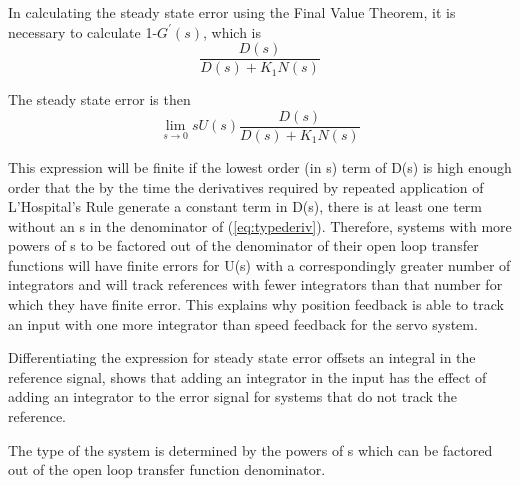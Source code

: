 \documentclass[11pt,a4paper]{article}
\begin{document}
\begin{enumerate}
In calculating the steady state error using the Final Value Theorem, it is necessary to calculate 1-$G^{\prime}(s)$, which is
\begin{equation}\label{eq:typederiv}
	\frac{D(s)}{D(s) + K_{1}N(s)}
\end{equation}

The steady state error is then
\begin{equation}
	\lim_{s \to 0}sU(s)\frac{D(s)}{D(s) + K_{1}N(s)}
\end{equation}

This expression will be finite if the lowest order (in s) term of D(s) is high enough order that the by the time the derivatives required by repeated application of L'Hospital's Rule generate a constant term in D(s), there is at least one term without an s in the denominator of (\ref{eq:typederiv}). Therefore, systems with more powers of s to be factored out of the denominator of their open loop transfer functions will have finite errors for U(s) with a correspondingly greater number of integrators and will track references with fewer integrators than that number for which they have finite error. This explains why position feedback is able to track an input with one more integrator than speed feedback for the servo system. 

Differentiating the expression for steady state error offsets an integral in the reference signal, shows that adding an integrator in the input has the effect of adding an integrator to the error signal for systems that do not track the reference. 

The type of the system is determined by the powers of s which can be factored out of the open loop transfer function denominator.


\end{enumerate}
\end{document}
